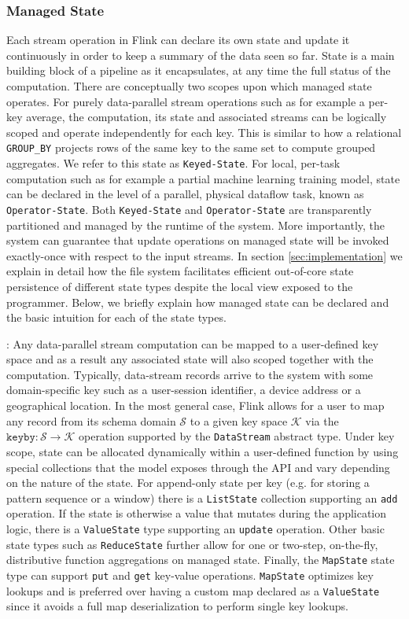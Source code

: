 \subsubsection{Managed State}
\label{sec:managedstate}
Each stream operation in Flink can declare its own state and update it continuously in order to keep a summary of the data seen so far. State is a main building block of a pipeline as it encapsulates, at any time the full status of the computation. There are conceptually two scopes upon which managed state operates. For purely data-parallel stream operations such as for example a per-key average, the computation, its state and associated streams can be logically scoped and operate independently for each key. This is similar to how a relational \texttt{GROUP\_BY} projects rows of the same key to the same set to compute grouped aggregates. We refer to this state as \texttt{Keyed-State}.
For local, per-task computation such as for example a partial machine learning training model, state can be declared in the level of a parallel, physical dataflow task, known as \texttt{Operator-State}. Both \texttt{Keyed-State} and \texttt{Operator-State} are transparently partitioned and managed by the runtime of the system. More importantly, the system can guarantee that update operations on managed state will be invoked exactly-once with respect to the input streams. In section \ref{sec:implementation} we explain in detail how the file system facilitates efficient out-of-core state persistence of different state types despite the local  view exposed to the programmer. Below, we briefly explain how managed state can be declared and the basic intuition for each of the state types. 

: Any data-parallel stream computation can be mapped to a user-defined key space and as a result any associated state will also scoped together with the computation. Typically, data-stream records arrive to the system with some domain-specific key such as a user-session identifier, a device address or a geographical location. In the most general case, Flink allows for a user to map any record from its schema domain $\mathcal{S}$ to a given key space $\mathcal{K}$ via the $\texttt{keyby}: \mathcal{S} \rightarrow \mathcal{K}$ operation supported by the \texttt{DataStream} abstract type. Under key scope, state can be allocated dynamically within a user-defined function by using special collections that the model exposes through the API and vary depending on the nature of the state. For append-only state per key (e.g. for storing a pattern sequence or a window) there is a \texttt{ListState} collection supporting an \texttt{add} operation. If  the state is otherwise a value that mutates during the application logic, there is a \texttt{ValueState} type supporting an \texttt{update} operation. Other basic state types such as \texttt{ReduceState} further allow for one or two-step, on-the-fly, distributive function aggregations on managed state. Finally, the \texttt{MapState} state type can support \texttt{put} and \texttt{get} key-value operations. \texttt{MapState} optimizes key lookups and is preferred over having a custom map declared as a \texttt{ValueState} since it avoids a full map deserialization to perform single key lookups.


